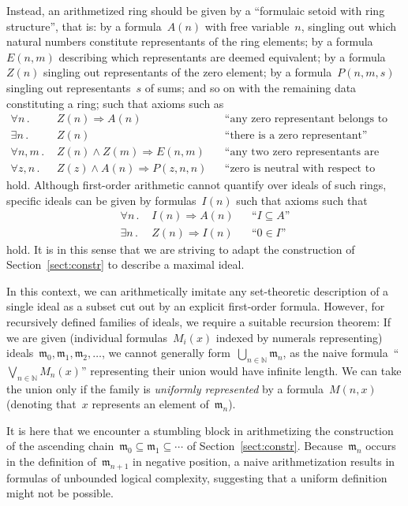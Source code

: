 \documentclass[oneside,reqno]{amsart}
\theoremstyle{definition}
\theoremstyle{plain}
\theoremstyle{remark}
\newcommand{\mmm}{\mathfrak{m}}
\newcommand{\NN}{\mathbb{N}}
\renewcommand{\_}{\mathpunct{.}\,}
\begin{document}
Instead, an arithmetized ring should be given by a ``formulaic setoid with ring
structure'', that is: by a formula~$A(n)$ with free
variable~$n$, singling out which natural numbers constitute
representants of the ring elements; by a formula~$E(n,m)$ describing which
representants are deemed equivalent; by a formula~$Z(n)$ singling out
representants of the zero element; by a formula~$P(n,m,s)$ singling out
representants~$s$ of sums; and so on with the remaining data constituting
a ring; such that axioms such as
\begin{align*}
  \forall n\_ & Z(n) \Rightarrow A(n) && \text{``any zero representant belongs to the ring''} \\
  \exists n\_ & Z(n) && \text{``there is a zero representant''} \\
  \forall n,m\_ & Z(n) \wedge Z(m) \Longrightarrow E(n,m) && \text{``any two zero representants are equivalent''} \\
  \forall z,n\_ & Z(z) \wedge A(n) \Longrightarrow P(z,n,n) && \text{``zero is neutral with respect to addition''}
\end{align*}
hold. Although first-order arithmetic cannot quantify over ideals of such
rings, specific ideals can be given by formulas~$I(n)$ such that axioms such that
\begin{align*}
  \forall n\_ & I(n) \Rightarrow A(n) && \text{``$I \subseteq A$''} \\
  \exists n\_ & Z(n) \Rightarrow I(n) && \text{``$0 \in I$''}
\end{align*}
hold. It is in this sense that we are striving to adapt the construction of
Section~\ref{sect:constr} to describe a maximal ideal.

In this context, we can arithmetically imitate any set-theoretic description of
a single ideal as a subset cut out by an explicit first-order formula. However, for
recursively defined families of ideals, we require a suitable recursion
theorem: If we are given (individual formulas~$M_i(x)$ indexed by numerals
representing) ideals~$\mmm_0,\mmm_1,\mmm_2,\ldots$, we cannot generally
form~$\bigcup_{n\in\NN} \mmm_n$, as the naive formula~``$\bigvee_{n\in\NN} M_n(x)$''
representing their union would have infinite length. We can take the union only
if the family is \emph{uniformly represented} by a formula~$M(n,x)$ (denoting
that~$x$ represents an element of~$\mmm_n$).

It is here that we encounter a stumbling block in arithmetizing the
construction of the ascending chain~$\mmm_0 \subseteq \mmm_1 \subseteq \cdots$
of Section~\ref{sect:constr}. Because~$\mmm_n$ occurs in the
definition of~$\mmm_{n+1}$ in negative position, a naive arithmetization
results in formulas of unbounded logical complexity, suggesting that
a uniform definition might not be possible.
\end{document}
